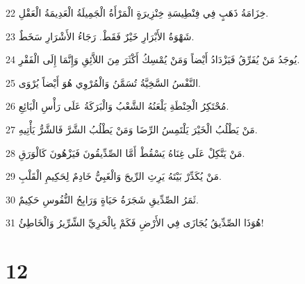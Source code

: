 \par 22 خِزَامَةُ ذَهَبٍ فِي فِنْطِيسَةِ خِنْزِيرَةٍ الْمَرْأَةُ الْجَمِيلَةُ الْعَدِيمَةُ الْعَقْلِ.
\par 23 شَهْوَةُ الأَبْرَارِ خَيْرٌ فَقَطْ. رَجَاءُ الأَشْرَارِ سَخَطٌ.
\par 24 يُوجَدُ مَنْ يُفَرِّقُ فَيَزْدَادُ أَيْضاً وَمَنْ يُمْسِكُ أَكْثَرَ مِنَ اللاَّئِقِ وَإِنَّمَا إِلَى الْفَقْرِ.
\par 25 النَّفْسُ السَّخِيَّةُ تُسَمَّنُ وَالْمُرْوِي هُوَ أَيْضاً يُرْوَى.
\par 26 مُحْتَكِرُ الْحِنْطَةِ يَلْعَنُهُ الشَّعْبُ وَالْبَرَكَةُ عَلَى رَأْسِ الْبَائِعِ.
\par 27 مَنْ يَطْلُبُ الْخَيْرَ يَلْتَمِسُ الرِّضَا وَمَنْ يَطْلُبُ الشَّرَّ فَالشَّرُّ يَأْتِيهِ.
\par 28 مَنْ يَتَّكِلْ عَلَى غِنَاهُ يَسْقُطْ أَمَّا الصِّدِّيقُونَ فَيَزْهُونَ كَالْوَرَقِ.
\par 29 مَنْ يُكَدِّرْ بَيْتَهُ يَرِثِ الرِّيحَ وَالْغَبِيُّ خَادِمٌ لِحَكِيمِ الْقَلْبِ.
\par 30 ثَمَرُ الصِّدِّيقِ شَجَرَةُ حَيَاةٍ وَرَابِحُ النُّفُوسِ حَكِيمٌ.
\par 31 هُوَذَا الصِّدِّيقُ يُجَازَى فِي الأَرْضِ فَكَمْ بِالْحَرِيِّ الشِّرِّيرُ وَالْخَاطِئُ!

\chapter{12}

